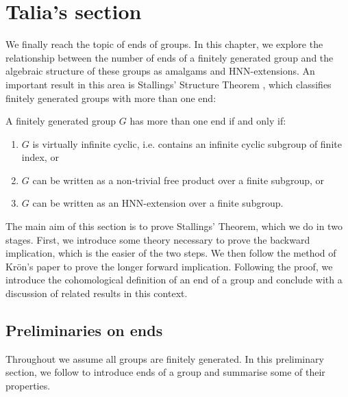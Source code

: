 \newpage %
\section{Talia's section}


We finally reach the topic of ends of groups. In this chapter, we explore the relationship between the number of ends of a finitely generated group and the algebraic structure of these groups as amalgams and HNN-extensions. An important result in this area is Stallings’ Structure Theorem \cite[p.~4]{S71}, which classifies finitely generated groups with more than one end:

\begin{theorem} 
\label{SST}
A finitely generated group \(G\) has more than one end if and only if:
    \begin{enumerate}
        \item \(G\) is virtually infinite cyclic, i.e. contains an infinite cyclic subgroup of finite index, or
        \item \(G\) can be written as a non-trivial free product over a finite subgroup, or
        \item \(G\) can be written as an HNN-extension over a finite subgroup. 
    \end{enumerate}
\end{theorem}

The main aim of this section is to prove Stallings' Theorem, which we do in two stages. First, we introduce some theory necessary to prove the backward implication, which is the easier of the two steps. We then follow the method of Kr{\"o}n's paper \cite{K10} to prove the longer forward implication. 
Following the proof, we introduce the cohomological definition of an end of a group and conclude with a discussion of related results in this context. %

\subsection{Preliminaries on ends}
Throughout we assume all groups are finitely generated. In this preliminary section, we follow \cite[p.~144--148]{bridson_haefliger_metric_1999} to introduce ends of a group and summarise some of their properties. 

